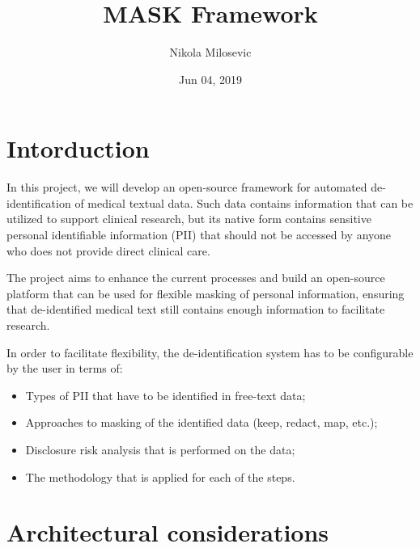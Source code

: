 \documentclass[letterpaper,10pt,english]{sphinxmanual}
\title{MASK Framework}
\date{Jun 04, 2019}
\author{Nikola Milosevic}
\begin{document}
\pagestyle{empty}
\sphinxmaketitle
\pagestyle{plain}
\sphinxtableofcontents
\pagestyle{normal}
\label{\detokenize{index::doc}}



\chapter{Intorduction}
\label{\detokenize{index:intorduction}}

In this project, we will develop an open-source framework for automated de-identification of medical textual data. Such data contains information that can be utilized to support clinical research, but its native form contains sensitive personal identifiable information (PII) that should not be accessed by anyone who does not provide direct clinical care.

The project aims to enhance the current processes and build an open-source platform that can be used for flexible masking of personal information, ensuring that de-identified medical text still contains enough information to facilitate research.

In order to facilitate flexibility, the de-identification system has to be configurable by the user in terms of:
\begin{itemize}
\item {} 
Types of PII that have to be identified in free-text data;

\item {} 
Approaches to masking of the identified data (keep, redact, map, etc.);

\item {} 
Disclosure risk analysis that is performed on the data;

\item {} 
The methodology that is applied for each of the steps.

\end{itemize}


\chapter{Architectural considerations}
\label{\detokenize{index:architectural-considerations}}
\end{document}
